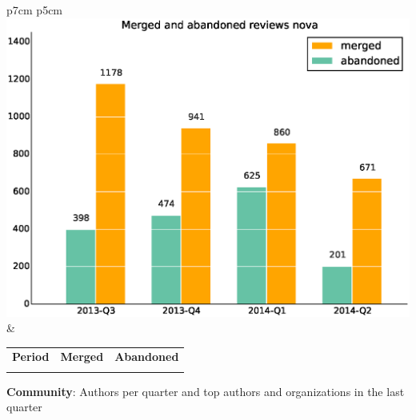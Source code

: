 \documentclass[a4wide,11pt]{report}
\begin{document}
\begin{tabular}{p{7cm} p{5cm}}
    \vspace{0pt} 
    \includegraphics[scale=.35]{figs/submitted_reviewsnova.eps}
    & 
    \vspace{0pt}
    \begin{tabular}{l|r|r|}%
    \bfseries Period & \bfseries Merged & \bfseries Abandoned %
    \csvreader[head to column names]{data/submitted_reviewsnova.csv}{}%
    {\\ & \merged & \abandoned}
    \end{tabular}
\end{tabular}


\textbf{Community}: Authors per quarter and top authors and organizations in the last quarter
\end{document}
